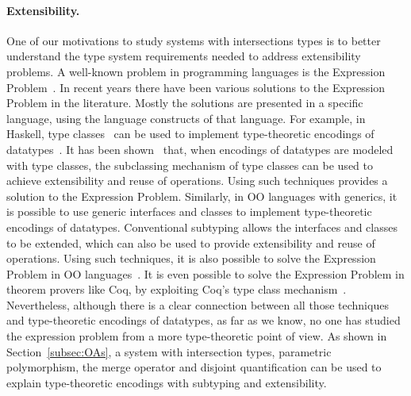 \paragraph{Extensibility.} One of our motivations to study systems
with intersections types is to better understand the
type system requirements needed to address extensibility problems.
A well-known problem in programming languages is the Expression
Problem~\cite{wadler1998expression}. In recent years there have been
various solutions to the Expression Problem in the literature. Mostly
the solutions are presented in a specific language, using the language
constructs of that language. For example, in Haskell, type classes~\cite{WadlerB89}
can be used to implement type-theoretic encodings of
datatypes~\cite{Hinze:2006}. It has been shown~\cite{finally-tagless}
that, when encodings of datatypes are modeled with type classes,
the subclassing mechanism of type classes can be used to achieve
extensibility and reuse of operations. Using such techniques provides
a solution to the Expression Problem. Similarly, in OO languages with
generics, it is possible to use generic interfaces and classes to
implement type-theoretic encodings of datatypes. Conventional
subtyping allows the interfaces and classes to be extended, which can
also be used to provide extensibility and reuse of operations. Using
such techniques, it is also possible to solve the Expression Problem
in OO languages~\cite{oliveira09modular,oliveira2012extensibility}.
It is even possible to solve the Expression Problem in theorem provers
like Coq, by exploiting Coq's type class mechanism~\cite{DelawareOS13}.
Nevertheless, although there is a clear connection between all those
techniques and type-theoretic encodings of datatypes, as far as we
know, no one has studied the expression problem from a more
type-theoretic point of view. As shown in Section~\ref{subsec:OAs}, a system
with intersection types, parametric polymorphism, the merge operator
and disjoint quantification can be used to explain type-theoretic
encodings with subtyping and extensibility.

